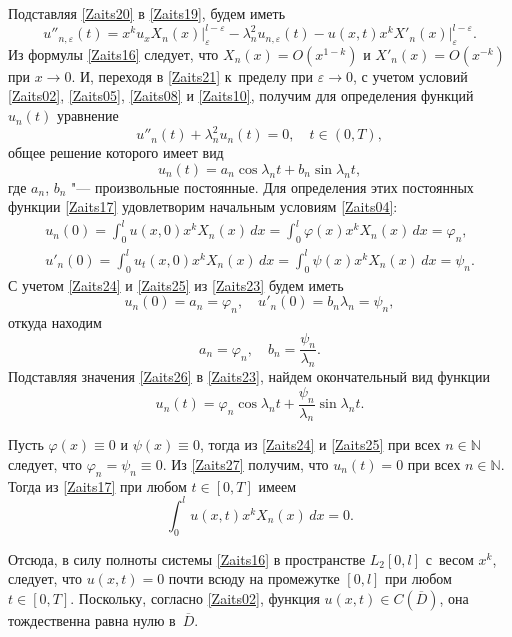 Подставляя \eqref{Zaits20} в \eqref{Zaits19}, будем иметь
\begin{equation}
\label{Zaits21}
u''_{n,\varepsilon}(t)=x^ku_xX_n(x)\Bigr|_\varepsilon^{l-\varepsilon}-\lambda_n^2u_{n,\varepsilon}(t)-u(x,t)x^kX'_n(x)\Bigr|_\varepsilon^{l-\varepsilon}.
\end{equation}
Из формулы \eqref{Zaits16} следует, что $X_n(x)=O(x^{1-k})$ и $X'_n(x)=O(x^{-k})$ при $x\rightarrow 0$. И, переходя в \eqref{Zaits21} к~пределу при $\varepsilon\rightarrow0$, с учетом условий \eqref{Zaits02}, \eqref{Zaits05}, \eqref{Zaits08} и \eqref{Zaits10}, получим для определения функций $u_n(t)$ уравнение
\begin{equation}
\label{Zaits22}
u''_n(t)+\lambda_n^2u_n(t)=0,\quad t\in(0, T),
\end{equation}
общее решение которого имеет вид
\begin{equation}
\label{Zaits23}
u_n(t)=a_n\cos{\lambda_nt}+b_n\sin{\lambda_nt},
\end{equation}
где $a_n$, $b_n$ "--- произвольные постоянные. 
Для определения этих постоянных функции \eqref{Zaits17} удовлетворим начальным условиям \eqref{Zaits04}:
\begin{gather}
\label{Zaits24}
u_n(0)= \int _0^l u(x, 0)x^kX_n(x)\,dx= \int _0^l \varphi(x)x^kX_n(x)\,dx=\varphi_n,
\\
\label{Zaits25}
u'_n(0)= \int _0^l u_t(x, 0)x^kX_n(x)\,dx= \int _0^l \psi(x)x^kX_n(x)\,dx=\psi_n.
\end{gather}
С учетом \eqref{Zaits24} и \eqref{Zaits25} из \eqref{Zaits23} будем иметь
$$u_n(0)=a_n=\varphi_n,\quad u'_n(0)=b_n\lambda_n=\psi_n,$$
откуда находим
\begin{equation}
\label{Zaits26}
a_n=\varphi_n,\quad b_n=\frac{\psi_n}{\lambda_n}.
\end{equation}
Подставляя значения \eqref{Zaits26} в \eqref{Zaits23}, найдем окончательный вид функции
\begin{equation}
\label{Zaits27}
u_n(t)=\varphi_n\cos{\lambda_nt}+\frac{\psi_n}{\lambda_n}\sin{\lambda_nt}.
\end{equation}

Пусть $\varphi(x)\equiv0$ и $\psi(x)\equiv0$, тогда из \eqref{Zaits24} и \eqref{Zaits25} при всех $n\in \mathbb{N}$ следует, что $\varphi_n=\psi_n\equiv0$. 
Из \eqref{Zaits27} получим, что $u_n(t)=0$ при всех $n\in \mathbb{N}$. 
Тогда из \eqref{Zaits17} при любом $t\in[0, T]$ имеем 
$$ \int _0^l u(x,t)x^kX_n(x)\,dx=0.$$

Отсюда, в силу полноты системы \eqref{Zaits16} в пространстве $L_2[0, l]$ с~весом $x^k$, следует, что $u(x,t)=0$ почти всюду на промежутке $[0, l]$ при любом $t\in[0, T]$. 
Поскольку, согласно \eqref{Zaits02}, функция $u(x,t)\in C(\overline{D})$, она тождественна равна нулю в~$\overline{D}$.

